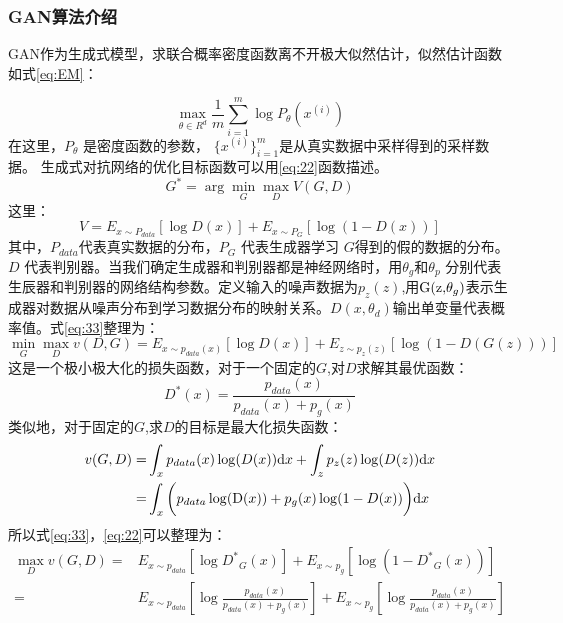 \subsubsection{GAN算法介绍}
GAN作为生成式模型，求联合概率密度函数离不开极大似然估计，似然估计函数如式\ref{eq:EM}：

\begin{equation}
\label{eq:EM}
\max \limits_{\theta\in R^{d}}\frac{1}{m} \sum_{i=1}^m \log P_{\theta}(x^{(i)})
\end{equation}
在这里，$P_{\theta}$ 是密度函数的参数， $\{x^{(i)}\}^{m} _{i=1}$是从真实数据中采样得到的采样数据。
生成式对抗网络的优化目标函数可以用\ref{eq:22}函数描述。
\begin{equation}
\label{eq:22}
G^{*}=\arg \min \limits_{G} \max \limits_{D} V(G,D)
\end{equation}
这里：
\begin{equation}
\label{eq:33}
V=E_{x\sim P_{data}} [\log D(x)]+E_{x\sim P_{G}}[\log (1-D(x))]
\end{equation}
其中，$P_{data}$代表真实数据的分布，$P_{G}$ 代表生成器学习 $G$得到的假的数据的分布。 $D$ 代表判别器。当我们确定生成器和判别器都是神经网络时，用${\theta _g}$和${\theta _p}$ 分别代表生辰器和判别器的网络结构参数。定义输入的噪声数据为$ {p_z}(z)$,用${\rm{G(z,}}{\theta _g}{\rm{)}}$表示生成器对数据从噪声分布到学习数据分布的映射关系。$D(x,{\theta _d})$输出单变量代表概率值。式\ref{eq:33}整理为：
\begin{equation}
\label{eq:44}
\mathop {\min }\limits_G \mathop {\max }\limits_D v(D,G) = {E_{x \sim {p_{data}}(x)}}[\log D(x)] + {E_{z \sim {p_z}(z)}}[\log (1 - D(G(z)))]
\end{equation}
 这是一个极小极大化的损失函数，对于一个固定的$G$,对$D$求解其最优函数：
 \begin{equation}
 \label{eq:34}
 {D^*}(x) = \frac{{{p_{data}}(x)}}{{{p_{data}}(x) + {p_g}(x)}}
\end{equation}
 类似地，对于固定的$G$,求$D$的目标是最大化损失函数：
\begin{equation}\label{eq:36}
\begin{split}
v(G,D) =& \int_x {{p_{data}}(x)\log (D(x))}\mathrm{d}x + \int_z {{p_z}(z)\log (D(z))}\mathrm{d}x  \\
=&  \int_x \bigg( {{p_{data}}\log ({\rm{D}}(x)) + {p_g}(x)\log (1 - D(x))\bigg)}\mathrm{d}x 
\end{split}
\end{equation}
所以式\ref{eq:33}，\ref{eq:22}可以整理为：
\begin{equation}
\label{eq:35}
\begin{split}
\mathop {\max }\limits_D v(G,D) =& {E_{x \sim {p_{data}}}}[\log {D^*}_G(x)] + {E_{x \sim {p_g}}}[\log (1 - {D^*}_G(x))] \\
=& {E_{x \sim {p_{data}}}}[\log \frac{{{p_{data}}(x)}}{{{p_{data}}(x) + {p_g}(x)}}] + {E_{x \sim {p_g}}}[\log \frac{{{p_{data}}(x)}}{{{p_{data}}(x) + {p_g}(x)}}]
\end{split}
\end{equation}
